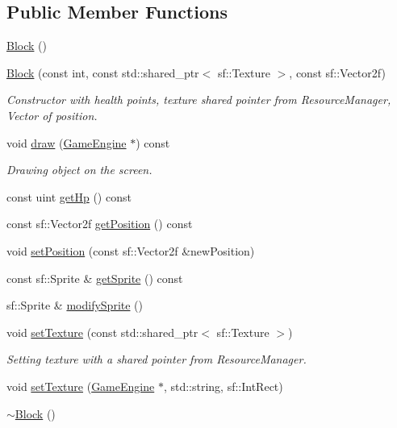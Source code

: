 \subsection*{Public Member Functions}
\begin{DoxyCompactItemize}
\item 
\mbox{\hyperlink{class_block_a37658a946bf5067ad01d68d9ff086adc}{Block}} ()
\item 
\mbox{\hyperlink{class_block_a6e2109c914d77166f2879944da582e7a}{Block}} (const int, const std\+::shared\+\_\+ptr$<$ sf\+::\+Texture $>$, const sf\+::\+Vector2f)
\begin{DoxyCompactList}\small\item\em Constructor with health points, texture shared pointer from Resource\+Manager, Vector of position. \end{DoxyCompactList}\item 
void \mbox{\hyperlink{class_block_a3a41cfe615a31b5c4b824004d248ba65}{draw}} (\mbox{\hyperlink{class_game_engine}{Game\+Engine}} $\ast$) const
\begin{DoxyCompactList}\small\item\em Drawing object on the screen. \end{DoxyCompactList}\item 
const uint \mbox{\hyperlink{class_block_a01788216d95ab7230287cb0d58a19c34}{get\+Hp}} () const
\item 
const sf\+::\+Vector2f \mbox{\hyperlink{class_block_ae7621aaed284804fc898174207eb1587}{get\+Position}} () const
\item 
void \mbox{\hyperlink{class_block_a9c4782f321b4760d572a01bd31c42a06}{set\+Position}} (const sf\+::\+Vector2f \&new\+Position)
\item 
const sf\+::\+Sprite \& \mbox{\hyperlink{class_block_a40e27a756a586c9784d4023163bf92ef}{get\+Sprite}} () const
\item 
sf\+::\+Sprite \& \mbox{\hyperlink{class_block_affece2c491813eba0583a9deeee9d925}{modify\+Sprite}} ()
\item 
void \mbox{\hyperlink{class_block_a01ef735022e9a92357e00cca6228f7b7}{set\+Texture}} (const std\+::shared\+\_\+ptr$<$ sf\+::\+Texture $>$)
\begin{DoxyCompactList}\small\item\em Setting texture with a shared pointer from Resource\+Manager. \end{DoxyCompactList}\item 
void \mbox{\hyperlink{class_block_a866e57c9df2c81910879ef991670931e}{set\+Texture}} (\mbox{\hyperlink{class_game_engine}{Game\+Engine}} $\ast$, std\+::string, sf\+::\+Int\+Rect)
\item 
\mbox{\hyperlink{class_block_a19d1bd0e1cef6a865ed2745a2e648405}{$\sim$\+Block}} ()
\end{DoxyCompactItemize}
